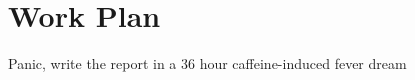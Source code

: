 \chapter{Work Plan}\label{sec:work_plan}

Panic, write the report in a 36 hour caffeine-induced fever dream
